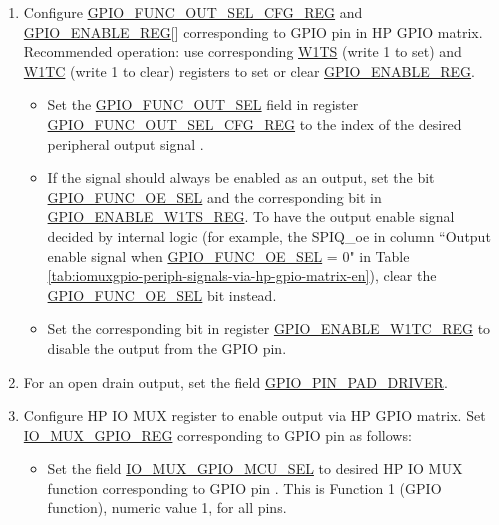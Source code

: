 \documentclass[main\_\_EN.tex]{subfiles}
\begin{document}
\begin{enumerate}
    \item Configure \hyperref[regdesc:GPIOFUNCNOUTSELCFGREG]{GPIO\_FUNC\_OUT\_SEL\_CFG\_REG} and  \hyperref[regdesc:GPIOENABLEREG]{GPIO\_ENABLE\_REG}[] corresponding to GPIO pin  in HP GPIO matrix. Recommended operation: use corresponding \hyperref[regdesc:GPIOENABLEW1TSREG]{W1TS} (write 1 to set) and \hyperref[regdesc:GPIOENABLEW1TCREG]{W1TC} (write 1 to clear) registers to set or clear \hyperref[regdesc:GPIOENABLEREG]{GPIO\_ENABLE\_REG}.


    \begin{itemize}
        \item Set the \hyperref[fielddesc:GPIOFUNCNOUTSEL]{GPIO\_FUNC\_OUT\_SEL} field in register \hyperref[regdesc:GPIOFUNCNOUTSELCFGREG]{GPIO\_FUNC\_OUT\_SEL\_CFG\_REG} to the index of the desired peripheral output signal .
        \item If the signal should always be enabled as an output, set the bit \hyperref[fielddesc:GPIOFUNCNOESEL]{GPIO\_FUNC\_OE\_SEL} and the corresponding bit in \hyperref[regdesc:GPIOENABLEW1TSREG]{GPIO\_ENABLE\_W1TS\_REG}. To have the output enable signal decided by internal logic (for example, the SPIQ\_oe in column ``Output enable signal when \hyperref[fielddesc:GPIOFUNCNOESEL]{GPIO\_FUNC\_OE\_SEL} = 0" in Table \ref{tab:iomuxgpio-periph-signals-via-hp-gpio-matrix-en}), clear the \hyperref[fielddesc:GPIOFUNCNOESEL]{GPIO\_FUNC\_OE\_SEL} bit instead.
       \item Set the corresponding bit in register \hyperref[regdesc:GPIOENABLEW1TCREG]{GPIO\_ENABLE\_W1TC\_REG} to disable the output from the GPIO pin.
    \end{itemize}
    \item For an open drain output, set the field \hyperref[fielddesc:GPIOPINNPADDRIVER]{GPIO\_PIN\_PAD\_DRIVER}.
    \item Configure HP IO MUX register to enable output via HP GPIO matrix. Set \hyperref[regdesc:IOMUXGPIONREG]{IO\_MUX\_GPIO\_REG} corresponding to GPIO pin  as follows:
    \begin{itemize}
        \item Set the field \hyperref[fielddesc:IOMUXGPIONMCUSEL]{IO\_MUX\_GPIO\_MCU\_SEL} to desired HP IO MUX function corresponding to GPIO pin . This is Function 1 (GPIO function), numeric value 1, for all pins.

\end{itemize}
\end{enumerate}
\end{document}

